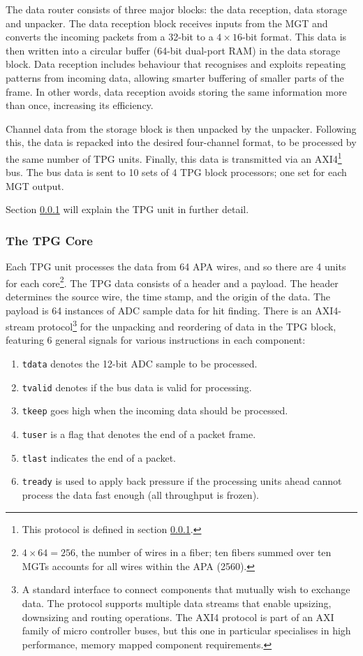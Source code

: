 \documentclass[10pt]{article}
\begin{document}
The data router consists of three major blocks: the data reception, data storage and unpacker. The data reception block receives inputs from the MGT and converts the incoming packets from a 32-bit to a $4\times16$-bit format. This data is then written into a circular buffer (64-bit dual-port RAM) in the data storage block. Data reception includes behaviour that recognises and exploits repeating patterns from incoming data, allowing smarter buffering of smaller parts of the frame. In other words, data reception avoids storing the same information more than once, increasing its efficiency.

Channel data from the storage block is then unpacked by the unpacker. Following this, the data is repacked into the desired four-channel format, to be processed by the same number of TPG units. Finally, this data is transmitted via an AXI4\footnote{This protocol is defined in section \ref{tpgcoresec}.} bus. The bus data is sent to 10 sets of 4 TPG block processors; one set for each MGT output.

Section \ref{tpgcoresec} will explain the TPG unit in further detail.

\subsubsection{The TPG Core}\label{tpgcoresec}

Each TPG unit processes the data from 64 APA wires, and so there are 4 units for each core\footnote{$4\times 64 = 256$, the number of wires in a fiber; ten fibers summed over ten MGTs accounts for all wires within the APA (2560).}.
The TPG data consists of a header and a payload. The header determines the source wire, the time stamp, and the origin of the data. The payload is 64 instances of ADC sample data for hit finding. There is an AXI4-stream protocol\footnote{A standard interface to connect components that mutually wish to exchange data. The protocol supports multiple data streams that enable upsizing, downsizing and routing operations. The AXI4 protocol is part of an AXI family of micro controller buses, but this one in particular specialises in high performance, memory mapped component requirements.} for the unpacking and reordering of data in the TPG block, featuring 6 general signals for various instructions in each component:

\begin{enumerate}
	\item \texttt{tdata} denotes the 12-bit ADC sample to be processed.
	\item \texttt{tvalid} denotes if the bus data is valid for processing.
	\item \texttt{tkeep} goes high when the incoming data should be processed.
	\item \texttt{tuser} is a flag that denotes the end of a packet frame.
	\item \texttt{tlast} indicates the end of a packet.
	\item \texttt{tready} is used to apply back pressure if the processing units ahead cannot process the data fast enough (all throughput is frozen).
\end{enumerate}
\end{document}
